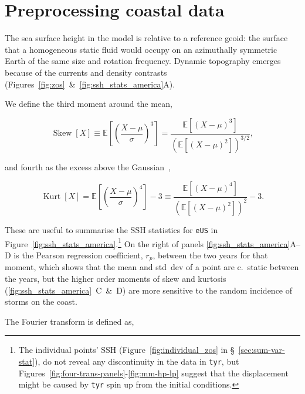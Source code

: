 \section{Preprocessing coastal data}
\label{sec:Preprocessing}
The sea surface height in the model is relative to
a reference geoid: the surface that a homogeneous static fluid would occupy
on an azimuthally symmetric Earth of the same size and rotation frequency.
Dynamic topography emerges because of the
currents and density contrasts (Figures~\ref{fig:zos}~\&~\ref{fig:ssh_stats_america}A).




We define the third  moment around the mean,

\begin{equation}
\operatorname{Skew}[X]\equiv \mathbb{E}\left[\left(\frac{X-\mu}{\sigma}\right)^{3}\right]
=\frac{\mathbb{E}\left[(X-\mu)^{3}\right]}{\left(\mathbb{E}\left[(X-\mu)^{2}\right]\right)^{3 / 2}},
\end{equation}

and fourth as the excess above the Gaussian~\cite{taleb2019statistical},

\begin{equation}
\operatorname{Kurt}[X]=
\mathbb{E}\left[\left(\frac{X-\mu}{\sigma}\right)^{4}\right]-3
\equiv \frac{\mathbb{E}\left[(X-\mu)^{4}\right]}{\left(\mathbb{E}\left[(X-\mu)^{2}\right]\right)^{2}}-3.
\end{equation}






These are useful to summarise the SSH statistics
for \texttt{eUS} in Figure~\ref{fig:ssh_stats_america}.\footnote{
The individual points' SSH (Figure~\ref{fig:individual_zos} in §~\ref{sec:sum-var-stat}),
do not reveal any discontinuity in the data in \texttt{tyr},
 but Figures~\ref{fig:four-trans-panels}-\ref{fig:mm-hp-lp}
suggest that the displacement might be caused by \texttt{tyr} spin up from the
initial conditions.
}
On the right of panels \ref{fig:ssh_stats_america}A--D
is the Pearson regression coefficient, $r_p$,
between the two years for that moment, which shows that the mean and
std~dev of a point are c.~static between the years,
but the higher order moments of skew and kurtosis
(\ref{fig:ssh_stats_america}~C~\&~D) are more sensitive to the
random incidence of storms on the coast.


\label{sec:fourier}

The Fourier transform is defined as,

